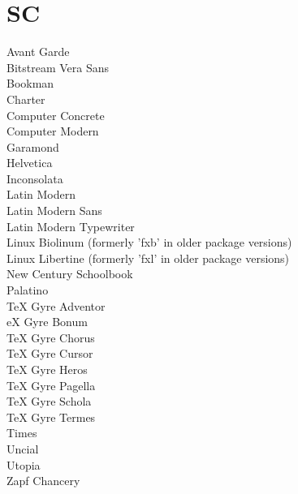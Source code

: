 \documentclass[12pt,a4paper]{report}
\begin{document}
    \section{SC}
     Avant Garde \\
     Bitstream Vera Sans \\
     Bookman \\
     Charter \\
     Computer Concrete \\
     Computer Modern \\
     Garamond \\
     Helvetica \\
     Inconsolata \\
     Latin Modern \\
     Latin Modern Sans \\
     Latin Modern Typewriter \\
     Linux Biolinum (formerly 'fxb' in older package versions) \\
     Linux Libertine (formerly 'fxl' in older package versions) \\
     New Century Schoolbook \\
     Palatino \\
     TeX Gyre Adventor \\ 
     eX Gyre Bonum \\
     TeX Gyre Chorus \\
     TeX Gyre Cursor \\
     TeX Gyre Heros \\
     TeX Gyre Pagella \\
     TeX Gyre Schola \\
     TeX Gyre Termes \\
     Times \\
     Uncial \\
     Utopia \\ 
     Zapf Chancery
\end{document}
